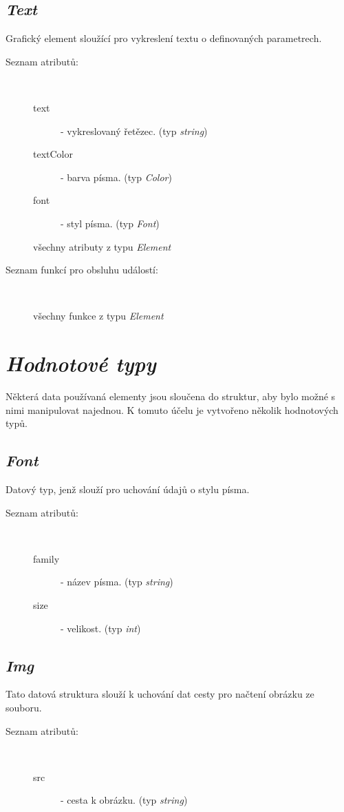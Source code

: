 \documentclass[11pt,twoside,a4paper]{book}
\begin{document}
\subsection{\textit{Text}}
Grafický element sloužící pro vykreslení textu o definovaných parametrech.\\
\begin{description}
\item[Seznam atributů:] ~
\begin{description}
\item[text] - vykreslovaný řetězec. (typ \textit{string})
\item[textColor] - barva písma. (typ \textit{Color})
\item[font] - styl písma. (typ \textit{Font})
\item[všechny atributy z typu \textit{Element}]
\end{description}
\item[Seznam funkcí pro obsluhu událostí:] ~
\begin{description}
\item[všechny funkce z typu \textit{Element}]
\end{description}
\end{description}

\section{\textit{Hodnotové typy}}
Některá data používaná elementy jsou sloučena do struktur, aby bylo možné s nimi manipulovat najednou. K tomuto účelu je vytvořeno několik hodnotových typů.
\subsection{\textit{Font}}
Datový typ, jenž slouží pro uchování údajů o stylu písma.\\
\begin{description}
\item[Seznam atributů:] ~
\begin{description}
\item[family] - název písma. (typ \textit{string})
\item[size] - velikost. (typ \textit{int})
\end{description}
\end{description}

\subsection{\textit{Img}}
Tato datová struktura slouží k uchování dat cesty pro načtení obrázku ze souboru.\\
\begin{description}
\item[Seznam atributů:] ~
\begin{description}
\item[src] - cesta k obrázku. (typ \textit{string})
\end{description}
\end{description}
\end{document}
